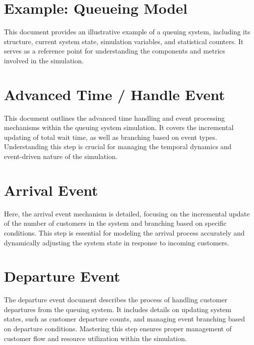 \documentclass{article}
\begin{document}
\section*{Example: Queueing Model}
This document provides an illustrative example of a queuing system, including its structure, current system state, simulation variables, and statistical counters. It serves as a reference point for understanding the components and metrics involved in the simulation.

\section*{Advanced Time / Handle Event}
This document outlines the advanced time handling and event processing mechanisms within the queuing system simulation. It covers the incremental updating of total wait time, as well as branching based on event types. Understanding this step is crucial for managing the temporal dynamics and event-driven nature of the simulation.

\section*{Arrival Event}
Here, the arrival event mechanism is detailed, focusing on the incremental update of the number of customers in the system and branching based on specific conditions. This step is essential for modeling the arrival process accurately and dynamically adjusting the system state in response to incoming customers.

\section*{Departure Event}
The departure event document describes the process of handling customer departures from the queuing system. It includes details on updating system states, such as customer departure counts, and managing event branching based on departure conditions. Mastering this step ensures proper management of customer flow and resource utilization within the simulation.
\end{document}
